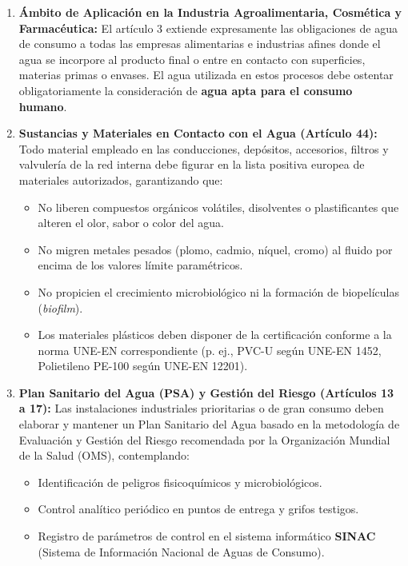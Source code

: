 \documentclass{report}
\begin{document}
\begin{enumerate}
    \item \textbf{Ámbito de Aplicación en la Industria Agroalimentaria, Cosmética y Farmacéutica:}
          El artículo 3 extiende expresamente las obligaciones de agua de consumo a todas las empresas alimentarias e industrias afines donde el agua se incorpore al producto final o entre en contacto con superficies, materias primas o envases. El agua utilizada en estos procesos debe ostentar obligatoriamente la consideración de \textbf{agua apta para el consumo humano}.
    \item \textbf{Sustancias y Materiales en Contacto con el Agua (Artículo 44):}
          Todo material empleado en las conducciones, depósitos, accesorios, filtros y valvulería de la red interna debe figurar en la lista positiva europea de materiales autorizados, garantizando que:
          \begin{itemize}
              \item No liberen compuestos orgánicos volátiles, disolventes o plastificantes que alteren el olor, sabor o color del agua.
              \item No migren metales pesados (plomo, cadmio, níquel, cromo) al fluido por encima de los valores límite paramétricos.
              \item No propicien el crecimiento microbiológico ni la formación de biopelículas (\textit{biofilm}).
              \item Los materiales plásticos deben disponer de la certificación conforme a la norma UNE-EN correspondiente (p. ej., PVC-U según UNE-EN 1452, Polietileno PE-100 según UNE-EN 12201).
          \end{itemize}
    \item \textbf{Plan Sanitario del Agua (PSA) y Gestión del Riesgo (Artículos 13 a 17):}
          Las instalaciones industriales prioritarias o de gran consumo deben elaborar y mantener un Plan Sanitario del Agua basado en la metodología de Evaluación y Gestión del Riesgo recomendada por la Organización Mundial de la Salud (OMS), contemplando:
          \begin{itemize}
              \item Identificación de peligros fisicoquímicos y microbiológicos.
              \item Control analítico periódico en puntos de entrega y grifos testigos.
              \item Registro de parámetros de control en el sistema informático \textbf{SINAC} (Sistema de Información Nacional de Aguas de Consumo).

\end{itemize}
\end{enumerate}
\end{document}
